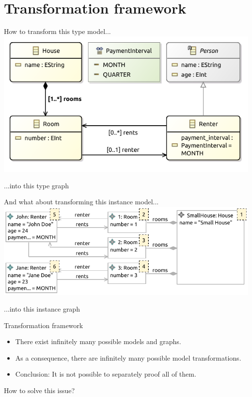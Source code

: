 \section{Transformation framework}

\begin{frame}{How to transform this type model...}
    \centering
    \includegraphics[trim={0 0.45cm 0 0.25cm},clip]{images/02_modelling_languages/type_model_example.pdf}
\end{frame}

\begin{frame}{...into this type graph}
    \centering
    
\end{frame}

\begin{frame}{And what about transforming this instance model...}
    \centering
    \includegraphics[]{images/02_modelling_languages/instance_model_example.pdf}
\end{frame}

\begin{frame}{...into this instance graph}
    \centering
    
\end{frame}

\begin{frame}{Transformation framework}
    \begin{itemize}
        \item There exist infinitely many possible models and graphs.
        \item As a consequence, there are infinitely many possible model transformations.\pause
        \item Conclusion: It is not possible to separately proof all of them.
    \end{itemize}
    \vspace{1cm}
    How to solve this issue?
\end{frame}

